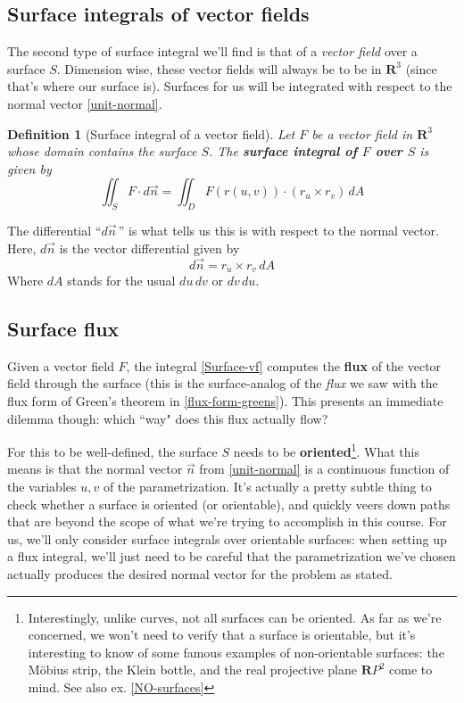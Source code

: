 \documentclass[12pt]{article}
\numberwithin{equation}{subsection}
\numberwithin{figure}{subsection}
\newtheorem{defn}[subsection]{Definition}
\theoremstyle{note}
\begin{document}
{\subsection{Surface integrals of vector fields} The second type of surface integral we'll find is that of a \textit{vector field} over a surface $S$. Dimension wise, these vector fields will always be to be in $\mathbf{R}^3$ (since that's where our surface is). Surfaces for us will be integrated with respect to the normal vector \eqref{unit-normal}.

\begin{defn}[Surface integral of a vector field] Let $F$ be a vector field in $\mathbf{R}^3$ whose domain contains the surface $S$. The \textbf{surface integral of $F$ over $S$} is given by 
\begin{equation}
	\label{Surface-vf}
	\iint_{S} F\cdot d\vec{n} = \iint_D  F(r(u,v)) \cdot (r_u \times r_v) \,dA	
\end{equation}
\end{defn}

The differential ``$d\vec{n}$\,'' is what tells us this is with respect to the normal vector. Here, $d\vec{n}$ is the vector differential given by \begin{equation} d\vec{n}= r_u \times r_v \,dA\end{equation} Where $dA$ stands for the usual $du \,dv$ or $dv\,du$. %

\subsection{Surface flux} Given a vector field $F$, the integral \eqref{Surface-vf} computes the \textbf{flux} of the vector field through the surface (this is the surface-analog of the \textit{flux} we saw with the flux form of Green's theorem in \ref{flux-form-greens}). This presents an immediate dilemma though: which ``way" does this flux actually flow? 

For this to be well-defined, the surface $S$ needs to be \textbf{oriented}\footnote{Interestingly, unlike curves, not all surfaces can be oriented. As far as we're concerned, we won't need to verify that a surface is orientable, but it's interesting to know of some famous examples of non-orientable surfaces: the M\"obius strip, the Klein bottle, and the real projective plane $\mathbf{R}P^2$ come to mind. See also ex. \ref{NO-surfaces}}. What this means is that the normal vector $\vec{n}$ from \eqref{unit-normal} is a continuous function of the variables $u,v$ of the parametrization. It's actually a pretty subtle thing to check whether a surface is oriented (or orientable), and quickly veers down paths that are beyond the scope of what we're trying to accomplish in this course. For us, we'll only consider surface integrals over orientable surfaces: when setting up a flux integral, we'll just need to be careful that the parametrization we've chosen actually produces the desired normal vector for the problem as stated. 

}
\end{document}

